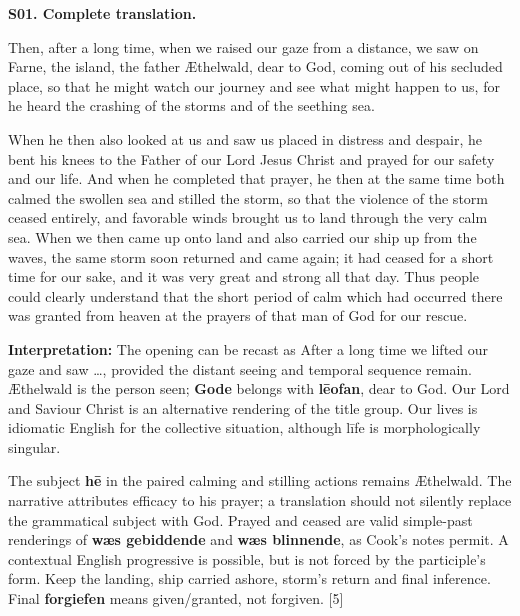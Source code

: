 \par\begin{minipage}{\linewidth}\raggedright
\textbf{S01. Complete translation.}

Then, after a long time, when we raised our gaze from a distance, we saw on Farne, the island, the father Æthelwald, dear to God, coming out of his secluded place, so that he might watch our journey and see what might happen to us, for he heard the crashing of the storms and of the seething sea.

When he then also looked at us and saw us placed in distress and despair, he bent his knees to the Father of our Lord Jesus Christ and prayed for our safety and our life. And when he completed that prayer, he then at the same time both calmed the swollen sea and stilled the storm, so that the violence of the storm ceased entirely, and favorable winds brought us to land through the very calm sea. When we then came up onto land and also carried our ship up from the waves, the same storm soon returned and came again; it had ceased for a short time for our sake, and it was very great and strong all that day. Thus people could clearly understand that the short period of calm which had occurred there was granted from heaven at the prayers of that man of God for our rescue.

\textbf{Interpretation:} The opening can be recast as After a long time we lifted our gaze and saw …, provided the distant seeing and temporal sequence remain. Æthelwald is the person seen; \textbf{Gode} belongs with \textbf{lēofan}, dear to God. Our Lord and Saviour Christ is an alternative rendering of the title group. Our lives is idiomatic English for the collective situation, although līfe is morphologically singular.

The subject \textbf{hē} in the paired calming and stilling actions remains Æthelwald. The narrative attributes efficacy to his prayer; a translation should not silently replace the grammatical subject with God. Prayed and ceased are valid simple-past renderings of \textbf{wæs gebiddende} and \textbf{wæs blinnende}, as Cook's notes permit. A contextual English progressive is possible, but is not forced by the participle's form. Keep the landing, ship carried ashore, storm's return and final inference. Final \textbf{forgiefen} means given/\allowbreak{}granted, not forgiven. [5]

\end{minipage}\par\addvspace{4pt}

